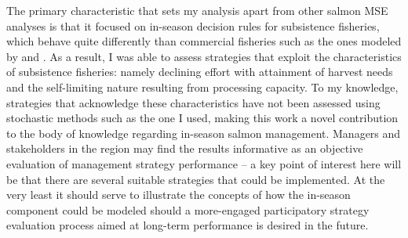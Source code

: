 \documentclass[12pt,]{book}
\theoremstyle{definition}
\theoremstyle{definition}
\theoremstyle{definition}
\theoremstyle{remark}
\begin{document}
The primary characteristic that sets my analysis apart from other salmon
MSE analyses is that it focused on in-season decision rules for
subsistence fisheries, which behave quite differently than commercial
fisheries such as the ones modeled by \citet{carney-adkison-2014a} and
\citet{carney-adkison-2014b}. As a result, I was able to assess
strategies that exploit the characteristics of subsistence fisheries:
namely declining effort with attainment of harvest needs and the
self-limiting nature resulting from processing capacity. To my
knowledge, strategies that acknowledge these characteristics have not
been assessed using stochastic methods such as the one I used, making
this work a novel contribution to the body of knowledge regarding
in-season salmon management. Managers and stakeholders in the region may
find the results informative as an objective evaluation of management
strategy performance -- a key point of interest here will be that there
are several suitable strategies that could be implemented. At the very
least it should serve to illustrate the concepts of how the in-season
component could be modeled should a more-engaged participatory strategy
evaluation process aimed at long-term performance is desired in the
future.

\clearpage
\end{document}
